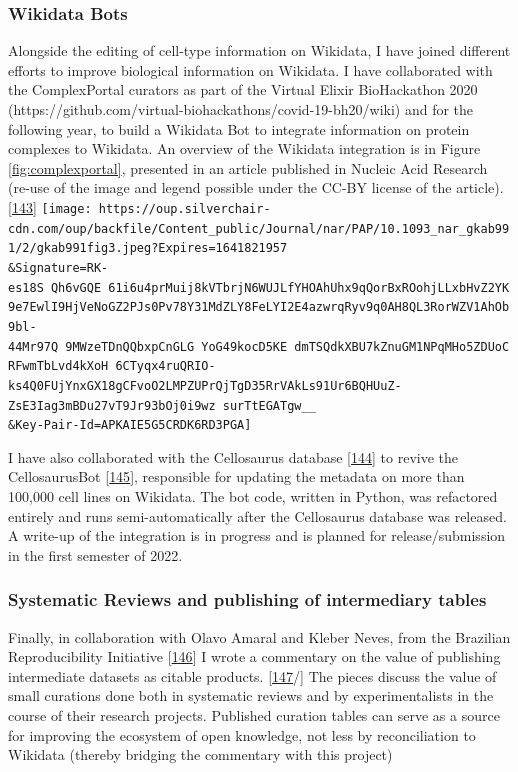 \hypertarget{wikidata-bots}{%
\subsubsection{Wikidata Bots}\label{wikidata-bots}}

Alongside the editing of cell-type information on Wikidata, I have joined different efforts to improve biological information on Wikidata.
I have collaborated with the ComplexPortal curators as part of the Virtual Elixir BioHackathon 2020 (https://github.com/virtual-biohackathons/covid-19-bh20/wiki) and for the following year, to build a Wikidata Bot to integrate information on protein complexes to Wikidata. An overview of the Wikidata integration is in Figure \ref{fig:complexportal}, presented in an article published in Nucleic Acid Research (re-use of the image and legend possible under the CC-BY license of the article). {[}\protect\hyperlink{ref-CQRJ53gu}{143}{]}
\texttt{[image: https://oup.silverchair-cdn.com/oup/backfile/Content\_public/Journal/nar/PAP/10.1093\_nar\_gkab991/2/gkab991fig3.jpeg?Expires=1641821957\\\&Signature=RK-es18S~Qh6vGQE~61i6u4prMuij8kVTbrjN6WUJLfYHOAhUhx9qQorBxROohjLLxbHvZ2YK9e7EwlI9HjVeNoGZ2PJs0Pv78Y31MdZLY8FeLYI2E4azwrqRyv9q0AH8QL3RorWZV1AhOb9bl-44Mr97Q~9MWzeTDnQQbxpCnGLG~YoG49kocD5KE~dmTSQdkXBU7kZnuGM1NPqMHo5ZDUoCRFwmTbLvd4kXoH~6CTyqx4ruQRIO-ks4Q0FUjYnxGX18gCFvoO2LMPZUPrQjTgD35RrVAkLs91Ur6BQHUuZ-ZsE3Iag3mBDu27vT9Jr93bOj0i9wz~surTtEGATgw\_\_\\\&Key-Pair-Id=APKAIE5G5CRDK6RD3PGA]}

I have also collaborated with the Cellosaurus database {[}\protect\hyperlink{ref-1DguATd9G}{144}{]} to revive the CellosaurusBot {[}\protect\hyperlink{ref-lMQxhx3q}{145}{]}, responsible for updating the metadata on more than 100,000 cell lines on Wikidata. The bot code, written in Python, was refactored entirely and runs semi-automatically after the Cellosaurus database was released. A write-up of the integration is in progress and is planned for release/submission in the first semester of 2022.

\hypertarget{systematic-reviews-and-publishing-of-intermediary-tables}{%
\subsubsection{Systematic Reviews and publishing of intermediary tables}\label{systematic-reviews-and-publishing-of-intermediary-tables}}

Finally, in collaboration with Olavo Amaral and Kleber Neves, from the Brazilian Reproducibility Initiative {[}\protect\hyperlink{ref-F2mYjDJ0}{146}{]} I wrote a commentary on the value of publishing intermediate datasets as citable products. {[}\protect\hyperlink{ref-HbZ13t8l}{147}/{]}
The pieces discuss the value of small curations done both in systematic reviews and by experimentalists in the course of their research projects. Published curation tables can serve as a source for improving the ecosystem of open knowledge, not less by reconciliation to Wikidata (thereby bridging the commentary with this project)

